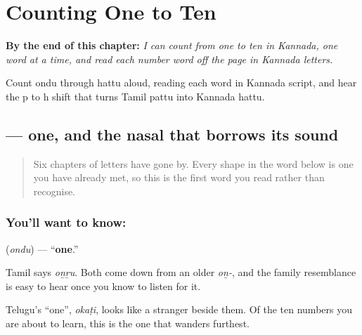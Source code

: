 
\chapter{Counting One to Ten}
\label{ch:ka-numbers-one-to-ten}

\begin{chapteropening}
\textbf{By the end of this chapter:} \emph{I can count from one to ten in Kannada, one word at a time, and read each number word off the page in Kannada letters.}

Count ondu through hattu aloud, reading each word in Kannada script, and hear the p to h shift that turns Tamil pattu into Kannada hattu.
\end{chapteropening}

\section[\texorpdfstring{\kn{ಒಂದು} (ondu)}{ಒಂದು (ondu)}]{ — one, and the nasal that borrows its sound}

\label{lesson:KA-C07-ondu}



\begin{quote}
Six chapters of letters have gone by. Every shape in the word below is one you have already met, so this is the first word you read rather than recognise.
\end{quote}

\subsection*{You'll want to know: }
\textbf{} (\emph{ondu}) — \textquotedblleft{}\textbf{one}.\textquotedblright{}

Tamil says \emph{oṉṟu}. Both come down from an older \emph{oṉ-}, and the family resemblance is easy to hear once you know to listen for it.

Telugu's \textquotedblleft{}one\textquotedblright{}, \emph{okaṭi}, looks like a stranger beside them. Of the ten numbers you are about to learn, this is the one that wanders furthest.

